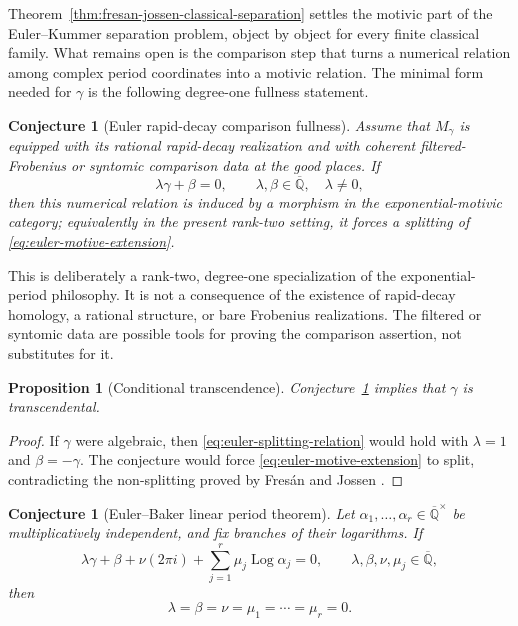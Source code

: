 \documentclass[11pt]{article}
\newtheorem{proposition}[theorem]{Proposition}
\newtheorem{conjecture}[theorem]{Conjecture}
\theoremstyle{definition}
\theoremstyle{remark}
\newcommand{\Qbar}{\overline{\mathbb Q}}
\newcommand{\Log}{\operatorname{Log}}
\begin{document}
Theorem~\ref{thm:fresan-jossen-classical-separation} settles the motivic
part of the Euler--Kummer separation problem, object by object for every
finite classical family.  What remains open is the comparison step that
turns a numerical relation among complex period coordinates into a motivic
relation.  The minimal form needed for $\gamma$ is the following degree-one
fullness statement.

\begin{conjecture}[Euler rapid-decay comparison fullness]
\label{conj:rapid-decay-analytic-subgroup}
Assume that $M_\gamma$ is equipped with its rational rapid-decay realization
and with coherent filtered-Frobenius or syntomic comparison data at the good
places.  If
\begin{equation}\label{eq:euler-splitting-relation}
 \lambda\gamma+\beta=0,
 \qquad \lambda,\beta\in\Qbar,\quad \lambda\ne0,
\end{equation}
then this numerical relation is induced by a morphism in the
exponential-motivic category; equivalently in the present rank-two setting,
it forces a splitting of \eqref{eq:euler-motive-extension}.
\end{conjecture}

This is deliberately a rank-two, degree-one specialization of the
exponential-period philosophy.  It is not a consequence of the existence
of rapid-decay homology, a rational structure, or bare Frobenius
realizations.  The filtered or syntomic data are possible tools for proving
the comparison assertion, not substitutes for it.

\begin{proposition}[Conditional transcendence]
\label{prop:rapid-decay-implies-gamma}
Conjecture~\ref{conj:rapid-decay-analytic-subgroup} implies that $\gamma$ is
transcendental.
\end{proposition}

\begin{proof}
If $\gamma$ were algebraic, then
\eqref{eq:euler-splitting-relation} would hold with $\lambda=1$ and
$\beta=-\gamma$.  The conjecture would force
\eqref{eq:euler-motive-extension} to split, contradicting the non-splitting
proved by Fres\'an and Jossen
\cite[Prop.~12.8.7]{FresanJossen}.
\end{proof}

\begin{conjecture}[Euler--Baker linear period theorem]
\label{conj:euler-baker}
Let $\alpha_1,\ldots,\alpha_r\in\Qbar^\times$ be multiplicatively
independent, and fix branches of their logarithms.  If
\begin{equation}\label{eq:euler-baker-relation}
 \lambda\gamma+\beta+\nu(2\pi i)
 +\sum_{j=1}^r\mu_j\Log\alpha_j=0,
 \qquad
 \lambda,\beta,\nu,\mu_j\in\Qbar,
\end{equation}
then
\[
 \lambda=\beta=\nu=\mu_1=\cdots=\mu_r=0.
\]
\end{conjecture}
\end{document}
